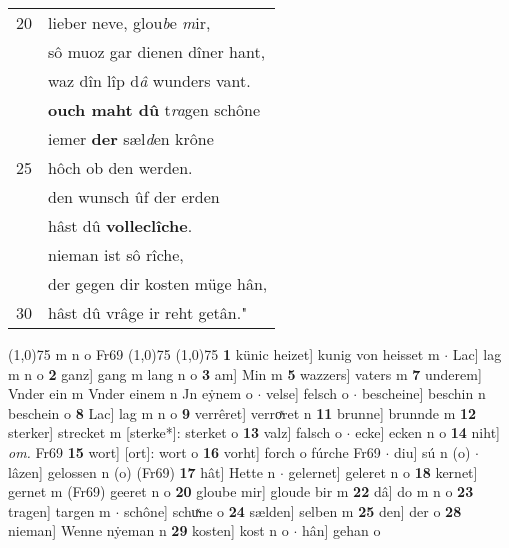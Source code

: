 \documentclass[8pt,a4paper,notitlepage]{article}
\begin{document}
\begin{table}[ht]
\begin{minipage}[t]{0.5\linewidth}
\begin{tabular}{rl}
20 & lieber neve, glou\textit{b}e \textit{m}ir,\\ 
 & sô muoz gar dienen dîner hant,\\ 
 & waz dîn lîp d\textit{â} wunders vant.\\ 
 & \textbf{ouch maht dû} t\textit{ra}gen schône\\ 
 & iemer \textbf{der} sæl\textit{d}en krône\\ 
25 & hôch ob den werden.\\ 
 & den wunsch ûf der erden\\ 
 & hâst dû \textbf{volleclîche}.\\ 
 & nieman ist sô rîche,\\ 
 & der gegen dir kosten müge hân,\\ 
30 & hâst dû vrâge ir reht getân."\\ 
\end{tabular}
\scriptsize
\line(1,0){75} \newline
m n o Fr69 \newline
\line(1,0){75} \newline
\newline
\line(1,0){75} \newline
\textbf{1} künic heizet] kunig von heisset m  $\cdot$ Lac] lag m n o \textbf{2} ganz] gang m lang n o \textbf{3} am] Min m \textbf{5} wazzers] vaters m \textbf{7} underem] Vnder ein m Vnder einem n Jn eẏnem o  $\cdot$ velse] felsch o  $\cdot$ bescheine] beschin n beschein o \textbf{8} Lac] lag m n o \textbf{9} verrêret] verroͯret n \textbf{11} brunne] brunnde m \textbf{12} sterker] strecket m [sterke*]: sterket o \textbf{13} valz] falsch o  $\cdot$ ecke] ecken n o \textbf{14} niht] \textit{om.} Fr69 \textbf{15} wort] [ort]: wort o \textbf{16} vorht] forch o fúrche Fr69  $\cdot$ diu] sú n (o)  $\cdot$ lâzen] gelossen n (o) (Fr69) \textbf{17} hât] Hette n  $\cdot$ gelernet] geleret n o \textbf{18} kernet] gernet m (Fr69) geeret n o \textbf{20} gloube mir] gloude bir m \textbf{22} dâ] do m n o \textbf{23} tragen] targen m  $\cdot$ schône] schuͯne o \textbf{24} sælden] selben m \textbf{25} den] der o \textbf{28} nieman] Wenne nẏeman n \textbf{29} kosten] kost n o  $\cdot$ hân] gehan o \newline
\end{minipage}
\end{table}
\newpage
\end{document}
